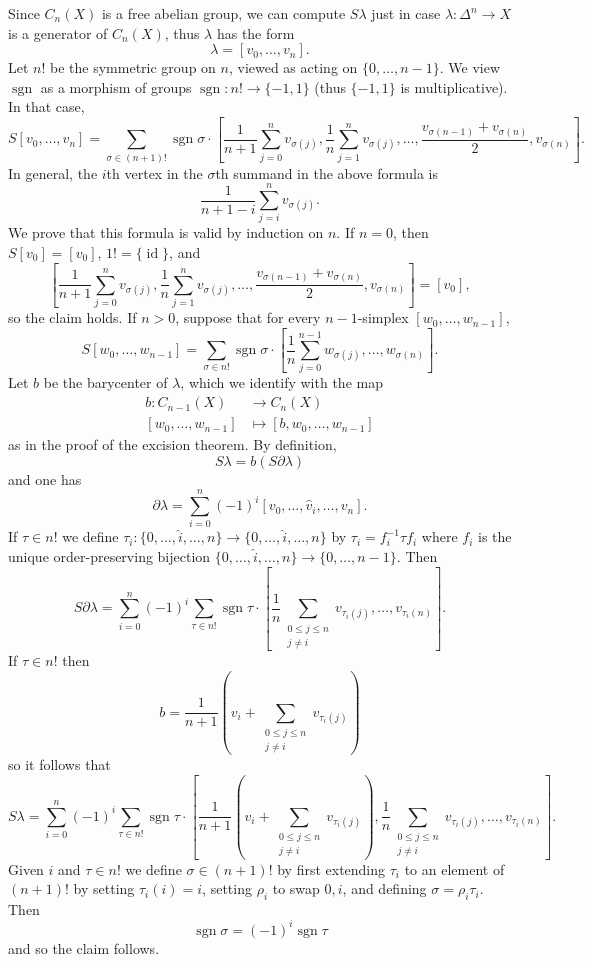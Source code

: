 \documentclass[10pt]{article}
\newcommand{\id}{\operatorname{id}}
\newcommand{\sgn}{\operatorname{sgn}}
\theoremstyle{definition}
\begin{document}
Since $C_n(X)$ is a free abelian group, we can compute $S\lambda$ just in case $\lambda: \Delta^n \to X$ is a generator of $C_n(X)$, thus $\lambda$ has the form
$$\lambda = [v_0, \dots, v_n].$$
Let $n!$ be the symmetric group on $n$, viewed as acting on $\{0, \dots, n-1\}$.
We view $\sgn$ as a morphism of groups $\sgn: n! \to \{-1, 1\}$ (thus $\{-1, 1\}$ is multiplicative).
In that case,
$$S[v_0, \dots, v_n] = \sum_{\sigma \in (n+1)!} \sgn \sigma \cdot
\left[\frac{1}{n+1} \sum_{j=0}^n v_{\sigma(j)}, \frac{1}{n} \sum_{j=1}^n v_{\sigma(j)}, \dots, \frac{v_{\sigma(n-1)} + v_{\sigma(n)}}{2}, v_{\sigma(n)} \right].$$
In general, the $i$th vertex in the $\sigma$th summand in the above formula is
$$\frac{1}{n+1-i} \sum_{j=i}^n v_{\sigma(j)}.$$
We prove that this formula is valid by induction on $n$. If $n = 0$, then $S[v_0] = [v_0]$, $1! = \{\id\}$, and
$$\left[\frac{1}{n+1} \sum_{j=0}^n v_{\sigma(j)}, \frac{1}{n} \sum_{j=1}^n v_{\sigma(j)}, \dots, \frac{v_{\sigma(n-1)} + v_{\sigma(n)}}{2}, v_{\sigma(n)} \right] = [v_0],$$
so the claim holds.
If $n > 0$, suppose that for every $n-1$-simplex $[w_0, \dots, w_{n-1}]$,
$$S[w_0, \dots, w_{n-1}] = \sum_{\sigma \in n!} \sgn \sigma \cdot \left[\frac{1}{n} \sum_{j=0}^{n-1} w_{\sigma(j)}, \dots, w_{\sigma(n)}\right].$$
Let $b$ be the barycenter of $\lambda$, which we identify with the map
\begin{align*}
b: C_{n-1}(X) &\to C_n(X)\\
[w_0, \dots, w_{n-1}] &\mapsto [b, w_0, \dots, w_{n-1}]
\end{align*}
as in the proof of the excision theorem. By definition,
$$S\lambda = b(S\partial\lambda)$$
and one has
$$\partial\lambda = \sum_{i=0}^n (-1)^i [v_0, \dots, \widehat v_i, \dots, v_n].$$
If $\tau \in n!$ we define $\tau_i: \{0, \dots, \widehat i, \dots, n\} \to \{0, \dots, \widehat i, \dots, n\}$ by $\tau_i = f_i^{-1}\tau f_i$ where $f_i$ is the unique order-preserving bijection $\{0, \dots, \widehat i, \dots, n\} \to \{0, \dots, n - 1\}$. Then
$$S\partial\lambda = \sum_{i=0}^n (-1)^i \sum_{\tau \in n!} \sgn \tau \cdot
\left[\frac{1}{n} \sum_{\substack{0 \leq j \leq n\\j \neq i}} v_{\tau_i(j)}, \dots, v_{\tau_i(n)}\right].$$
If $\tau \in n!$ then
$$b = \frac{1}{n+1} \left(v_i + \sum_{\substack{0 \leq j \leq n\\j \neq i}} v_{\tau_i(j)}\right)$$
so it follows that
$$S\lambda = \sum_{i=0}^n (-1)^i \sum_{\tau \in n!} \sgn \tau \cdot
\left[\frac{1}{n+1} \left(v_i + \sum_{\substack{0 \leq j \leq n\\j \neq i}} v_{\tau_i(j)}\right) , \frac{1}{n} \sum_{\substack{0 \leq j \leq n\\j \neq i}} v_{\tau_i(j)}, \dots, v_{\tau_i(n)} \right].
$$
Given $i$ and $\tau \in n!$ we define $\sigma \in (n+1)!$ by first extending $\tau_i$ to an element of $(n+1)!$ by setting $\tau_i(i) = i$, setting $\rho_i$ to swap $0, i$, and defining $\sigma = \rho_i\tau_i$. Then
$$\sgn \sigma = (-1)^i \sgn \tau$$
and so the claim follows.
\end{document}

